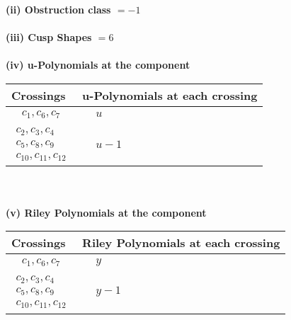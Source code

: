 \documentclass[1p]{elsarticle_modified}
\theoremstyle{definition}
\begin{document}
\flushleft \textbf{(ii) Obstruction class $= -1$}\\~\\
\flushleft \textbf{(iii) Cusp Shapes $= 6$}\\~\\
\newpage\renewcommand{\arraystretch}{1}
\flushleft \textbf{(iv) u-Polynomials at the component}\newline \\
\begin{tabular}{m{50pt}|m{274pt}}
Crossings & \hspace{64pt}u-Polynomials at each crossing \\
\hline $$\begin{aligned}c_{1},c_{6},c_{7}\end{aligned}$$&$\begin{aligned}
&u
\end{aligned}$\\
\hline $$\begin{aligned}c_{2},c_{3},c_{4}\\c_{5},c_{8},c_{9}\\c_{10},c_{11},c_{12}\end{aligned}$$&$\begin{aligned}
&u-1
\end{aligned}$\\
\hline
\end{tabular}\\~\\
\newpage\renewcommand{\arraystretch}{1}
\flushleft \textbf{(v) Riley Polynomials at the component}\newline \\
\begin{tabular}{m{50pt}|m{274pt}}
Crossings & \hspace{64pt}Riley Polynomials at each crossing \\
\hline $$\begin{aligned}c_{1},c_{6},c_{7}\end{aligned}$$&$\begin{aligned}
&y
\end{aligned}$\\
\hline $$\begin{aligned}c_{2},c_{3},c_{4}\\c_{5},c_{8},c_{9}\\c_{10},c_{11},c_{12}\end{aligned}$$&$\begin{aligned}
&y-1
\end{aligned}$\\
\hline
\end{tabular}\\~\\
\end{document}
